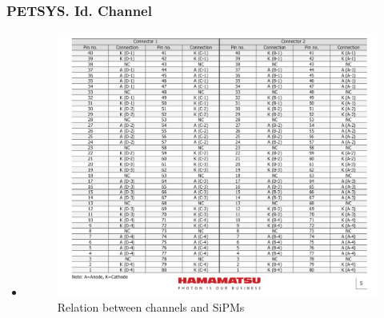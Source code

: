\documentclass{beamer}
\begin{document}
\begin{frame}
\frametitle{PETSYS. Id. Channel}
\begin{itemize}
\item{}

\begin{figure}[hbtp]
\centering
\includegraphics[scale=0.2]{PETSYS/Id_channel/relation_between_channels_and_SiPM.png}
\caption{Relation between channels and SiPMs}
\end{figure}

\end{itemize}

\end{frame}
\end{document}
